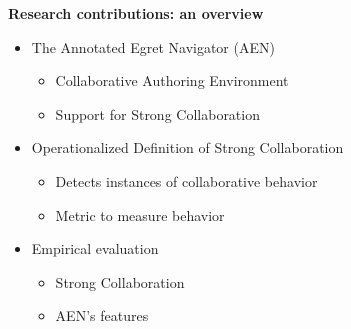 %
%


\begin{slide}\Huge 
  {\bf Research contributions: an overview}
  \horizontalline\\
  \begin{itemize}\huge
  \item The Annotated Egret Navigator (AEN)
    \begin{itemize}
    \item Collaborative Authoring Environment
    \item Support for Strong Collaboration
    \end{itemize}
  \item Operationalized Definition of Strong Collaboration
    \begin{itemize}
    \item Detects instances of collaborative behavior
    \item Metric to measure behavior
    \end{itemize}
  \item Empirical evaluation
    \begin{itemize}
    \item Strong Collaboration
    \item AEN's features
    \end{itemize}
  \end{itemize}
\end{slide}

